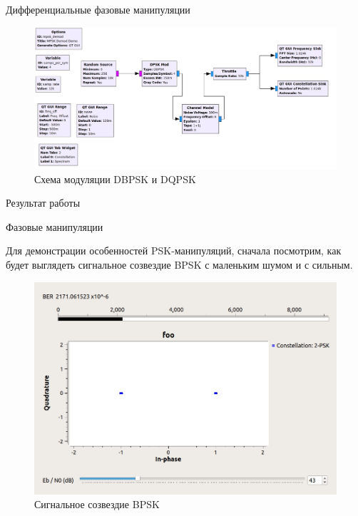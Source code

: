 	\begin{center}
	\large {Дифференциальные фазовые манипуляции}
	\end{center}
	\begin{figure}[H]
		\begin{center}
			\includegraphics[scale=0.4]{../dpsk_graph.jpg}
			\caption{Схема модуляции DBPSK и DQPSK} 
		\end{center}
	\end{figure}

	\large {Результат работы}
	\begin{center}
		\large {Фазовые манипуляции}
	\end{center}
	Для демонстрации особенностей PSK-манипуляций, сначала посмотрим, как будет выглядеть сигнальное созвездие BPSK с маленьким шумом и с сильным.
	
	\begin{figure}[H]
		\begin{center}
			\includegraphics[scale=0.4]{../bpsk.jpg}
			\caption{Сигнальное созвездие BPSK} 
		\end{center}
	\end{figure}
	
